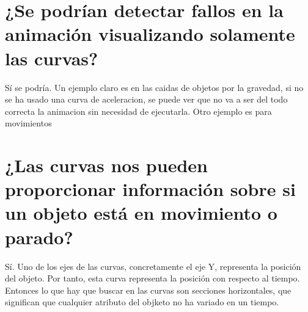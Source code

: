 \documentclass{article}
\begin{document}


\section{¿Se podrían detectar fallos en la animación visualizando solamente las curvas?}

Sí se podría. Un ejemplo claro es en las caidas de objetos por la gravedad, si no se ha usado una curva de aceleracion, se puede ver que no va a ser del todo correcta la animacion sin necesidad de ejecutarla. Otro ejemplo es para movimientos

\section{¿Las curvas nos pueden proporcionar información sobre si un objeto está en movimiento o parado?}

Sí. Uno de los ejes de las curvas, concretamente el eje Y, representa la posición del objeto. Por tanto, esta curva representa la posición con respecto al tiempo. Entonces lo que hay que buscar en las curvas son secciones horizontales, que significan que cualquier atributo del objketo no ha variado en un tiempo.
\end{document}
